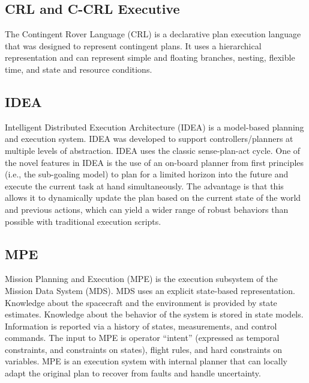 \documentclass[conference]{IEEEtran}
\begin{document}
\subsection{\textbf{CRL and C-CRL Executive}}\label{sec:crl}
The Contingent Rover Language (CRL) is a declarative plan execution language that was designed to represent contingent plans. It uses a hierarchical representation and can represent simple and floating branches, nesting, flexible time, and state and resource conditions. 



\subsection{\textbf{IDEA}}\label{sec:idea}
Intelligent Distributed Execution Architecture (IDEA) is a model-based planning and execution system. IDEA was developed to support controllers/planners at multiple levels of abstraction. IDEA uses the classic sense-plan-act cycle. One of the novel features in IDEA is the use of an on-board planner from first principles (i.e., the sub-goaling model) to plan for a limited horizon into the future and execute the current task at hand simultaneously. The advantage is that this allows it to dynamically update the plan based on the current state of the world and previous actions, which can yield a wider range of robust behaviors than possible with traditional execution scripts.


\subsection{\textbf{MPE}}\label{sec:mpe}
Mission Planning and Execution (MPE) is the execution subsystem of the Mission Data System (MDS). MDS uses an explicit state-based representation. Knowledge about the spacecraft and the environment is provided by state estimates. Knowledge about the behavior of the system is stored in state models. Information is reported via a history of states, measurements, and control commands. The input to MPE is operator “intent” (expressed as temporal constraints, and constraints on states), flight rules, and hard constraints on variables. MPE is an execution system with internal planner that can locally adapt the original plan to recover from faults and handle uncertainty.
\end{document}
